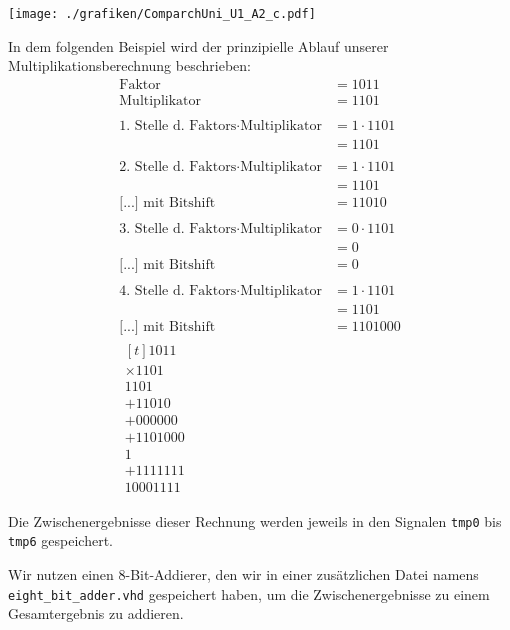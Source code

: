 \documentclass{pi3}
\begin{document}
\begin{center}
	\texttt{[image: ./grafiken/ComparchUni\_U1\_A2\_c.pdf]}
\end{center} 

\newpage
In dem folgenden Beispiel wird der prinzipielle Ablauf unserer Multiplikationsberechnung beschrieben:
\begin{align*}
\text{Faktor}&=1011\\
\text{Multiplikator}&=1101\\
\\
\text{1. Stelle d. Faktors} \cdot \text{Multiplikator}&= 1 \cdot 1101\\
&=1101\\
\\
\text{2. Stelle d. Faktors} \cdot \text{Multiplikator}&= 1 \cdot 1101\\
&=1101\\
\text{[...] mit Bitshift}&= 11010\\
\\
\text{3. Stelle d. Faktors} \cdot \text{Multiplikator}&= 0 \cdot 1101\\
&=0\\
\text{[...] mit Bitshift}&= 0\\
\\
\text{4. Stelle d. Faktors} \cdot \text{Multiplikator}&= 1 \cdot 1101\\
&=1101\\
\text{[...] mit Bitshift}&= 1101000\\
\begin{aligned}[t]
1011 &\\
\times  1101& \\
\hline
1101&\\
+11010&\\
+000000&\\
+1101000&\\
\hline
{\scriptscriptstyle1} \; \; \; \; \; \; \; \,\\
+1111111\\
\hline
10001111
\end{aligned}
\end{align*}

Die Zwischenergebnisse dieser Rechnung werden jeweils in den Signalen \texttt{tmp0} bis \texttt{tmp6} gespeichert. 

Wir nutzen einen 8-Bit-Addierer, den wir in einer zusätzlichen Datei namens \texttt{eight\_bit\_adder.vhd} gespeichert haben, um die Zwischenergebnisse zu einem Gesamtergebnis zu addieren.
\end{document}
